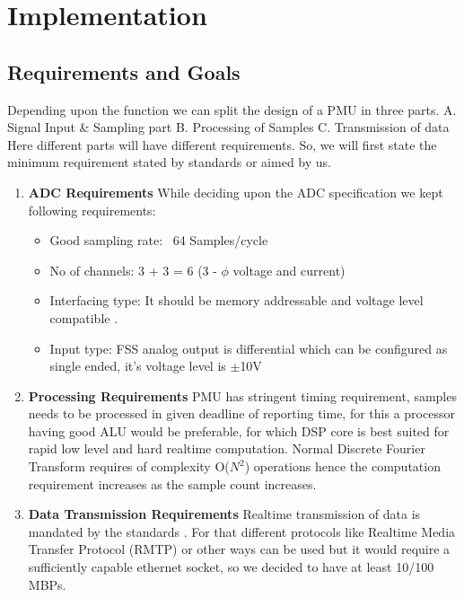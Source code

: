 \chapter{Implementation}
\section{Requirements and Goals}
Depending upon the function we can split the design of a PMU in three parts. 
A. Signal Input \& Sampling part
B. Processing of Samples  
C. Transmission of data
Here different parts will have different requirements. So, we will first state the minimum requirement stated by standards or aimed by us.

\begin{enumerate}
	\item \textbf{ADC Requirements}
	While deciding upon the ADC specification we kept following requirements: 
	\begin{itemize}
		\item Good sampling rate: ~64 Samples/cycle
		\item No of channels: 3 + 3 = 6 (3 - $\phi$ voltage and current) 
		\item Interfacing type: It should be memory addressable and voltage level compatible .
		\item Input type: FSS analog output is differential which can be configured as single ended, it's voltage level is $\pm$10V
	\end{itemize}
	
	\item \textbf{Processing Requirements}
	PMU has stringent timing requirement, samples needs to be processed in given deadline of reporting time, for this a processor having good ALU would be preferable, for which DSP core is best suited for rapid low level and hard realtime computation. Normal Discrete Fourier Transform requires of complexity O($N^{2}$) operations hence the computation requirement increases as the sample count increases. 
	
	\item \textbf{Data Transmission Requirements }
	Realtime transmission of data is mandated by the standards \cite{c37.118}. For that different protocols like Realtime  Media Transfer Protocol (RMTP) or other ways can be used but it would require a sufficiently capable ethernet socket, so we decided to have at least 10/100 MBPs.
	
\end{enumerate}

